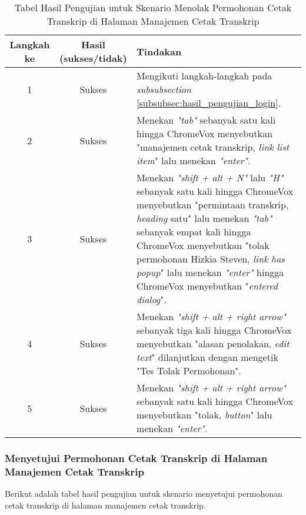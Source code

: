 \begin{table}[H]
    \centering 
    \caption{Tabel Hasil Pengujian untuk Skenario Menolak Permohonan Cetak Transkrip di Halaman Manajemen Cetak Transkrip}
    \label{tab:hasil_pengujian_menolak_permohonan_cetak_transkrip_di_halaman_manajemen_cetak_transkrip}
    \begin{tabular}{|c|c|p{10cm}|}
        \toprule
        Langkah ke & Hasil (sukses/tidak) & Tindakan \\

        \midrule
        1 & Sukses & Mengikuti langkah-langkah pada \textit{subsubsection} \ref{subsubsec:hasil_pengujian_login}. \\
        2 & Sukses & Menekan \textit{"tab"} sebanyak satu kali hingga ChromeVox menyebutkan "manajemen cetak transkrip, \textit{link list item}" lalu menekan \textit{"enter"}. \\
        3 & Sukses & Menekan \textit{"shift + alt + N"} lalu \textit{"H"} sebanyak satu kali hingga ChromeVox menyebutkan "permintaan transkrip, \textit{heading} satu" lalu menekan \textit{"tab"} sebanyak empat kali hingga ChromeVox menyebutkan "tolak permohonan Hizkia Steven, \textit{link has popup}" lalu menekan \textit{"enter"} hingga ChromeVox menyebutkan "\textit{entered dialog}". \\
        4 & Sukses & Menekan \textit{"shift + alt + right arrow"} sebanyak tiga kali hingga ChromeVox menyebutkan "alasan penolakan, \textit{edit text}" dilanjutkan dengan mengetik "Tes Tolak Permohonan". \\
        5 & Sukses & Menekan \textit{"shift + alt + right arrow"} sebanyak satu kali hingga ChromeVox menyebutkan "tolak, \textit{button}" lalu menekan \textit{"enter"}. \\ 

        \bottomrule

    \end{tabular}
\end{table}

\subsubsection{Menyetujui Permohonan Cetak Transkrip di Halaman Manajemen Cetak Transkrip}
\label{subsubsec:hasil_pengujian_menyetujui_permohonan_cetak_transkrip_di_halaman_manajemen_cetak_transkrip}
Berikut adalah tabel hasil pengujian untuk skenario menyetujui permohonan cetak transkrip di halaman manajemen cetak transkrip.

